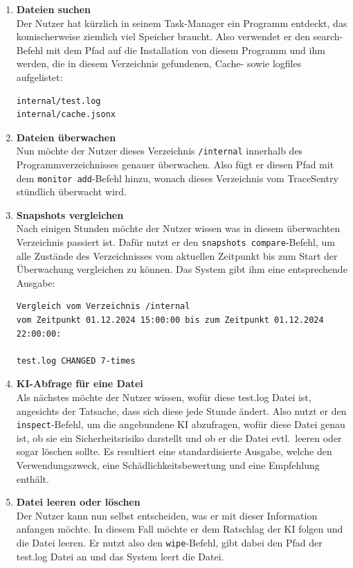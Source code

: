\documentclass[a4paper,12pt]{report}
\begin{document}
    \begin{enumerate}
        \item \textbf{Dateien suchen}\\
        Der Nutzer hat kürzlich in seinem Task-Manager ein Programm entdeckt, das komischerweise
        ziemlich viel Speicher braucht.
        Also verwendet er den search-Befehl mit dem Pfad auf die Installation von diesem Programm
        und ihm werden, die in diesem Verzeichnis gefundenen, Cache- sowie \gls{logfiles} aufgelistet:
        \begin{verbatim}
internal/test.log
internal/cache.jsonx
        \end{verbatim}

        \item \textbf{Dateien überwachen}\\
        Nun möchte der Nutzer dieses Verzeichnis \texttt{/internal} innerhalb des Programmverzeichnisses genauer überwachen.
        Also fügt er diesen Pfad mit dem \texttt{monitor add}-Befehl hinzu, wonach dieses Verzeichnis vom TraceSentry stündlich überwacht wird.

        \item \textbf{Snapshots vergleichen}\\
        Nach einigen Stunden möchte der Nutzer wissen was in diesem überwachten Verzeichnis passiert ist.
        Dafür nutzt er den  \texttt{snapshots compare}-Befehl, um alle Zustände des Verzeichnisses vom aktuellen Zeitpunkt bis zum Start der Überwachung vergleichen zu können.
        Das System gibt ihm eine entsprechende Ausgabe:
        \begin{verbatim}
Vergleich vom Verzeichnis /internal
vom Zeitpunkt 01.12.2024 15:00:00 bis zum Zeitpunkt 01.12.2024 22:00:00:

test.log CHANGED 7-times
        \end{verbatim}

        \item \textbf{KI-Abfrage für eine Datei}\\
        Als nächstes möchte der Nutzer wissen, wofür diese test.log Datei ist, angesichts der Tatsache, dass sich diese jede Stunde ändert.
        Also nutzt er den \texttt{inspect}-Befehl, um die angebundene KI abzufragen, wofür diese Datei genau ist, ob sie ein Sicherheitsrisiko darstellt
        und ob er die Datei evtl.\ leeren oder sogar löschen sollte.
        Es resultiert eine standardisierte Ausgabe, welche den Verwendungszweck, eine Schädlichkeitsbewertung und eine Empfehlung enthält.

        \item \textbf{Datei leeren oder löschen}\\
        Der Nutzer kann nun selbst entscheiden, was er mit dieser Information anfangen möchte.
        In diesem Fall möchte er dem Ratschlag der KI folgen und die Datei leeren.
        Er nutzt also den \texttt{wipe}-Befehl, gibt dabei den Pfad der test.log Datei an und das System leert die Datei.
    \end{enumerate}
\end{document}
